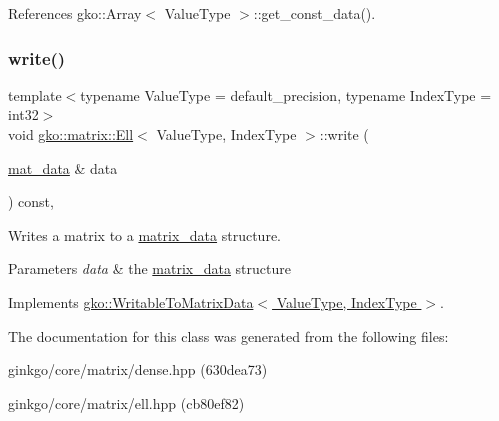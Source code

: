 References gko\+::\+Array$<$ Value\+Type $>$\+::get\+\_\+const\+\_\+data().

\mbox{\label{classgko_1_1matrix_1_1Ell_afa9148a16a9255003055d8e9156ee941}} 
\subsubsection{\texorpdfstring{write()}{write()}}
{\footnotesize\ttfamily template$<$typename Value\+Type = default\+\_\+precision, typename Index\+Type = int32$>$ \\
void \hyperlink{classgko_1_1matrix_1_1Ell}{gko\+::matrix\+::\+Ell}$<$ Value\+Type, Index\+Type $>$\+::write (\begin{DoxyParamCaption}\item[{\hyperlink{structgko_1_1matrix__data}{mat\+\_\+data} \&}]{data }\end{DoxyParamCaption}) const\hspace{0.3cm}{\ttfamily [override]}, {\ttfamily [virtual]}}



Writes a matrix to a \hyperlink{structgko_1_1matrix__data}{matrix\+\_\+data} structure. 


\begin{DoxyParams}{Parameters}
{\em data} & the \hyperlink{structgko_1_1matrix__data}{matrix\+\_\+data} structure \\
\hline
\end{DoxyParams}


Implements \hyperlink{classgko_1_1WritableToMatrixData_a96036c3a4bf4c67fa93002808b8b14e2}{gko\+::\+Writable\+To\+Matrix\+Data$<$ Value\+Type, Index\+Type $>$}.



The documentation for this class was generated from the following files\+:\begin{DoxyCompactItemize}
\item 
ginkgo/core/matrix/dense.\+hpp (630dea73)\item 
ginkgo/core/matrix/ell.\+hpp (cb80ef82)\end{DoxyCompactItemize}
